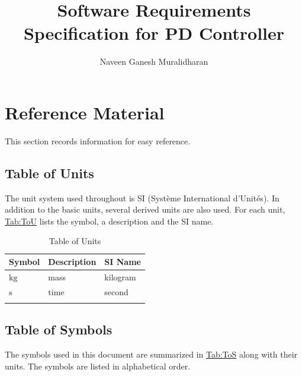\documentclass[12pt]{article}
\title{Software Requirements Specification for PD Controller}
\author{Naveen Ganesh Muralidharan}
\begin{document}
\maketitle
\tableofcontents
\newpage
\section{Reference Material}
\label{Sec:RefMat}
This section records information for easy reference.

\subsection{Table of Units}
\label{Sec:ToU}
The unit system used throughout is SI (Système International d'Unités). In addition to the basic units, several derived units are also used. For each unit, \hyperref[Table:ToU]{Tab:ToU} lists the symbol, a description and the SI name.

\begin{longtable}{l l l}
\toprule
\textbf{Symbol} & \textbf{Description} & \textbf{SI Name}
\\
\midrule
\endhead
${\text{kg}}$ & mass & kilogram
\\
${\text{s}}$ & time & second
\\
\bottomrule
\caption{Table of Units}
\label{Table:ToU}
\end{longtable}
\subsection{Table of Symbols}
\label{Sec:ToS}
The symbols used in this document are summarized in \hyperref[Table:ToS]{Tab:ToS} along with their units. The symbols are listed in alphabetical order.
\end{document}
